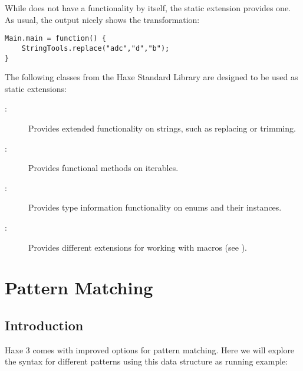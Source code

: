 \documentclass{haxe}
\begin{document}

While  does not have a  functionality by itself, the  static extension provides one. As usual, the  output nicely shows the transformation:

\begin{lstlisting}
Main.main = function() {
	StringTools.replace("adc","d","b");
}
\end{lstlisting}

The following classes from the Haxe Standard Library are designed to be used as static extensions:

\begin{description}
	\item[:] Provides extended functionality on strings, such as replacing or trimming.
	\item[:] Provides functional methods on iterables.
	\item[:] Provides type information functionality on enums and their instances.
	\item[:] Provides different extensions for working with macros (see ).
\end{description}






\section{Pattern Matching}
\label{lf-pattern-matching}

\subsection{Introduction}
\label{lf-pattern-matching-introduction}

Haxe 3 comes with improved options for pattern matching. Here we will explore the syntax for different patterns using this data structure as running example:
\end{document}

